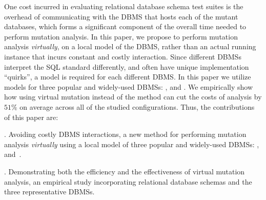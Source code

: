 

One cost incurred in evaluating relational database schema test suites is the overhead of communicating with the DBMS that hosts each of the mutant databases, which forms a significant component of the overall time needed to perform mutation analysis. In this paper, we propose to perform mutation analysis {\it virtually}, on a local model of the DBMS, rather than an actual running instance that incurs constant and costly interaction. Since different DBMSs interpret the SQL standard differently, and often have unique implementation ``quirks'', a model is required for each different DBMS. In this paper we utilize models for three popular and widely-used DBMSs: \HyperSQL, \Postgres and \SQLite. We empirically show how using virtual mutation instead of the \Original method can cut the costs of analysis by $51\%$ on average across all of the studied configurations. Thus, the contributions of this paper are:

\vspace{1mm} . Avoiding costly DBMS interactions, a new method for performing mutation analysis {\it virtually} using a
local model of three popular and widely-used DBMSs: \HyperSQL, \mbox{\Postgres and \SQLite.}

\vspace{1mm} . Demonstrating both the efficiency and the effectiveness of \mbox{virtual} mutation analysis, an empirical study
incorporating \numschemas relational database schemas and the three representative DBMSs.


